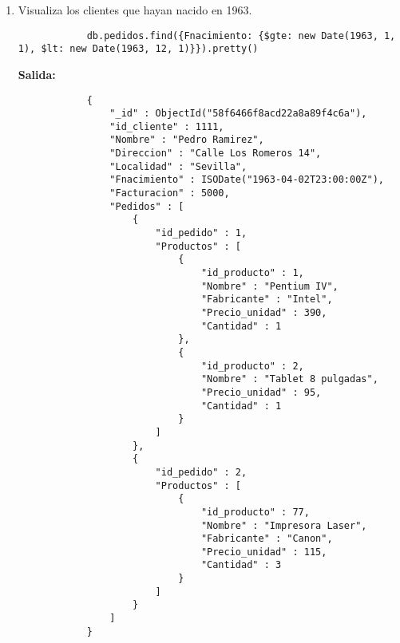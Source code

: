 \begin{enumerate}
	\item Visualiza los clientes que hayan nacido en 1963.
		\begin{lstlisting}
			db.pedidos.find({Fnacimiento: {$gte: new Date(1963, 1, 1), $lt: new Date(1963, 12, 1)}}).pretty()
		\end{lstlisting}
		\textbf{Salida:}
		\begin{lstlisting}
			{
				"_id" : ObjectId("58f6466f8acd22a8a89f4c6a"),
				"id_cliente" : 1111,
				"Nombre" : "Pedro Ramirez",
				"Direccion" : "Calle Los Romeros 14",
				"Localidad" : "Sevilla",
				"Fnacimiento" : ISODate("1963-04-02T23:00:00Z"),
				"Facturacion" : 5000,
				"Pedidos" : [
					{
						"id_pedido" : 1,
						"Productos" : [
							{
								"id_producto" : 1,
								"Nombre" : "Pentium IV",
								"Fabricante" : "Intel",
								"Precio_unidad" : 390,
								"Cantidad" : 1
							},
							{
								"id_producto" : 2,
								"Nombre" : "Tablet 8 pulgadas",
								"Precio_unidad" : 95,
								"Cantidad" : 1
							}
						]
					},
					{
						"id_pedido" : 2,
						"Productos" : [
							{
								"id_producto" : 77,
								"Nombre" : "Impresora Laser",
								"Fabricante" : "Canon",
								"Precio_unidad" : 115,
								"Cantidad" : 3
							}
						]
					}
				]
			}
		\end{lstlisting}


\end{enumerate}
